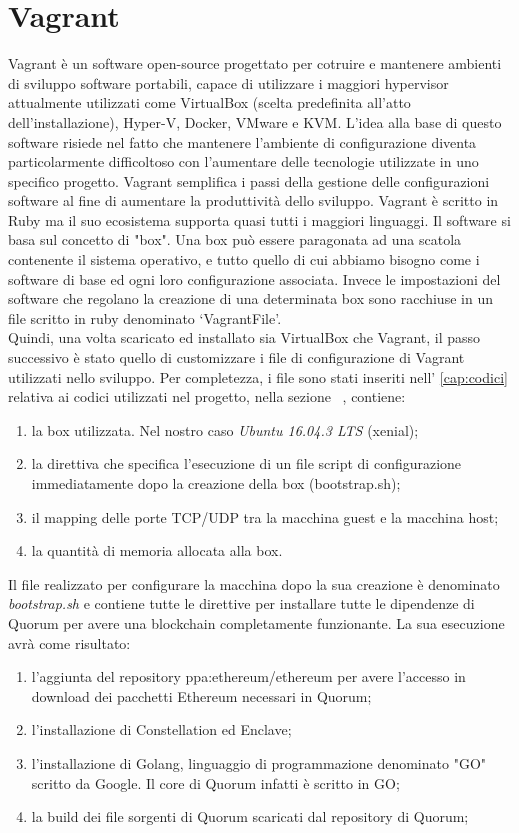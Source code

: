 \section{Vagrant} 
Vagrant è un software open-source progettato per cotruire e mantenere ambienti di sviluppo software portabili, capace di utilizzare i maggiori hypervisor attualmente utilizzati come VirtualBox (scelta predefinita all'atto dell'installazione), Hyper-V, Docker, VMware e KVM. L'idea alla base di questo software risiede nel fatto che mantenere l'ambiente di configurazione diventa particolarmente difficoltoso con l'aumentare delle tecnologie utilizzate in uno specifico progetto. Vagrant semplifica i passi della gestione delle configurazioni software al fine di aumentare la produttività dello sviluppo. Vagrant è scritto in Ruby ma il suo ecosistema supporta quasi tutti i maggiori linguaggi. Il software si basa sul concetto di "box". Una box può essere paragonata ad una scatola contenente il sistema operativo, e tutto quello di cui abbiamo bisogno come i software di base ed ogni loro configurazione associata. Invece le impostazioni del software che regolano la creazione di una determinata box sono racchiuse in un file scritto in ruby denominato \enquote*{VagrantFile}. \\
Quindi, una volta scaricato ed installato sia VirtualBox che Vagrant, il passo successivo è stato quello di customizzare i file di configurazione di Vagrant utilizzati nello sviluppo. Per completezza, i file sono stati inseriti nell' \autoref{cap:codici} relativa ai codici utilizzati nel progetto, nella sezione ~, contiene:
\begin{enumerate}
	\item la box utilizzata. Nel nostro caso \emph{Ubuntu 16.04.3 LTS} (xenial);
	\item la direttiva che specifica l'esecuzione di un file script di configurazione immediatamente dopo la creazione della box (bootstrap.sh);
	\item il mapping delle porte TCP/UDP tra la macchina guest e la macchina host;
	\item la quantità di memoria allocata alla box.
\end{enumerate}
Il file realizzato per configurare la macchina dopo la sua creazione è denominato \emph{bootstrap.sh} e contiene tutte le direttive per installare tutte le dipendenze di Quorum per avere una blockchain completamente funzionante. La sua esecuzione avrà come risultato:
\begin{enumerate}
	\item l'aggiunta del repository ppa:ethereum/ethereum per avere l'accesso in download dei pacchetti Ethereum necessari in Quorum;
	\item l'installazione di Constellation ed Enclave;
	\item l'installazione di Golang, linguaggio di programmazione denominato "GO" scritto da Google. Il core di Quorum infatti è scritto in GO;
	\item la build dei file sorgenti di Quorum scaricati dal repository di Quorum;
\end{enumerate}
